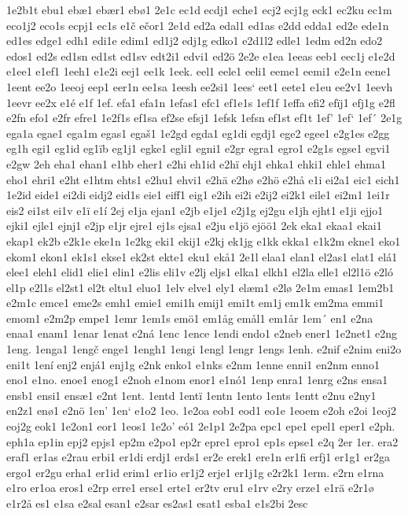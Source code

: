 1e2b1t
ebu1
ebæ1
ebær1
ebø1
2e1c
ec1d
ecdj1
eche1
ecj2
ecj1g
eck1
ec2ku
ec1m
eco1j2
eco1s
ecpj1
ec1s
e1č
ečor1
2e1d
ed2a
edal1
ed1as
e2dd
edda1
ed2e
ede1n
ed1es
edge1
edh1
edi1e
edim1
ed1j2
edj1g
edko1
e2d1l2
edle1
1edm
ed2n
edo2
edos1
ed2s
ed1sn
ed1st
ed1sv
edt2i1
edvi1
ed2ö
2e2e
e1ea
1eeas
eeb1
eec1j
e1e2d
e1ee1
e1ef1
1eeh1
e1e2i
eej1
ee1k
1eek.
eel1
eele1
eeli1
eeme1
eemi1
e2e1n
eene1
1eent
ee2o
1eeoj
eep1
eer1n
ee1sa
1eesh
ee2si1
1ees`
eet1
eete1
e1eu
ee2v1
1eevh
1eevr
ee2x
e1é
e1f
1ef.
efa1
efa1n
1efas1
efc1
ef1e1s
1ef1f
1effa
efi2
efïj1
efj1g
e2fl
e2fn
efo1
e2fr
efre1
1e2f1s
ef1sa
ef2se
efsj1
1efsk
1efsn
ef1st
ef1t
1ef'
1ef`
1ef´
2e1g
ega1a
egae1
ega1m
egas1
egaš1
1e2gd
egda1
eg1di
egdj1
ege2
egee1
e2g1es
e2gg
eg1h
egi1
eg1id
eg1ïb
eg1j1
egke1
egli1
egni1
e2gr
egra1
egro1
e2g1s
egse1
egvi1
e2gw
2eh
eha1
ehan1
e1hb
eher1
e2hi
eh1id
e2hï
ehj1
ehka1
ehki1
ehle1
ehma1
eho1
ehri1
e2ht
e1htm
ehts1
e2hu1
ehvi1
e2hä
e2hø
e2hö
e2hå
e1i
ei2a1
eic1
eich1
1e2id
eide1
ei2di
eidj2
eid1s
eie1
eiff1
eig1
e2ih
ei2i
e2ij2
ei2k1
eile1
ei2m1
1ei1r
eis2
ei1st
ei1v
e1ï
e1í
2ej
e1ja
ejan1
e2jb
e1je1
e2j1g
ej2gu
e1jh
ejht1
e1ji
ejjo1
ejki1
ejle1
ejnj1
e2jp
e1jr
ejre1
ej1s
ejsa1
e2ju
e1jö
ejöö1
2ek
eka1
ekaa1
ekai1
ekap1
ek2b
e2k1e
eke1n
1e2kg
eki1
ekij1
e2kj
ek1jg
e1kk
ekka1
e1k2m
ekne1
eko1
ekom1
ekon1
ek1s1
ekse1
ek2st
ekte1
eku1
ekå1
2e1l
elaa1
elan1
el2as1
elat1
elá1
elee1
eleh1
elid1
elie1
elin1
e2lis
eli1v
e2lj
eljs1
elka1
elkh1
el2la
elle1
el2l1ö
e2ló
el1p
e2l1s
el2st1
el2t
eltu1
eluo1
1elv
elve1
ely1
elæm1
e2lø
2e1m
emas1
1em2b1
e2m1c
emce1
eme2s
emh1
emie1
emi1h
emij1
emi1t
em1j
em1k
em2ma
emmi1
emom1
e2m2p
empe1
1emr
1em1s
emö1
em1åg
emål1
em1år
1em´
en1
e2na
enaa1
enam1
1enar
1enat
e2ná
1enc
1ence
1endi
endo1
e2neb
ener1
1e2net1
e2ng
1eng.
1enga1
1engč
enge1
1engh1
1engi
1engl
1engr
1engs
1enh.
e2nif
e2nim
eni2o
eni1t
1ení
enj2
enjá1
enj1g
e2nk
enko1
e1nks
e2nm
1enne
enni1
en2nm
enno1
eno1
e1no.
enoe1
enog1
e2noh
e1nom
enor1
e1nó1
1enp
enra1
1enrg
e2ns
ensa1
ensb1
ensi1
ensæ1
e2nt
1ent.
1entd
1entï
1entn
1ento
1ents
1entt
e2nu
e2ny1
en2z1
enø1
e2nö
1en'
1en`
e1o2
1eo.
1e2oa
eob1
eod1
eo1e
1eoem
e2oh
e2oi
1eoj2
eoj2g
eok1
1e2on1
eor1
1eos1
1e2o'
eó1
2e1p1
2e2pa
epc1
epe1
epel1
eper1
e2ph.
eph1a
ep1in
epj2
epjs1
ep2m
e2po1
ep2r
epre1
epro1
ep1s
epse1
e2q
2er
1er.
era2
eraf1
er1as
e2rau
erbi1
er1di
erdj1
erds1
er2e
erek1
ere1n
er1fi
erfj1
er1g1
er2ga
ergo1
er2gu
erha1
er1id
erim1
er1io
er1j2
erje1
er1j1g
e2r2k1
1erm.
e2rn
e1rna
e1ro
er1oa
eros1
e2rp
erre1
erse1
erte1
er2tv
eru1
e1rv
e2ry
erze1
e1rä
e2r1ø
e1r2å
es1
e1sa
e2sal
esan1
e2sar
es2as1
esat1
esba1
e1s2bi
2esc
